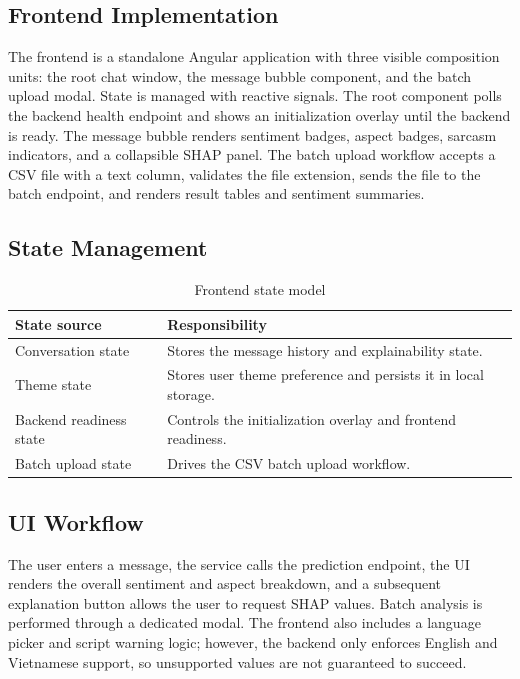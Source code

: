 \documentclass[12pt, a4paper]{article}
\begin{document}
\subsection{Frontend Implementation}
The frontend is a standalone Angular application with three visible composition units: the root chat window, the message bubble component, and the batch upload modal. State is managed with reactive signals. The root component polls the backend health endpoint and shows an initialization overlay until the backend is ready. The message bubble renders sentiment badges, aspect badges, sarcasm indicators, and a collapsible SHAP panel. The batch upload workflow accepts a CSV file with a text column, validates the file extension, sends the file to the batch endpoint, and renders result tables and sentiment summaries.

\subsection{State Management}
\begin{table}[H]
\centering
\caption{Frontend state model}
\begin{tabularx}{\textwidth}{@{} p{3cm} X @{}}
\toprule
\textbf{State source} & \textbf{Responsibility} \\
\midrule
Conversation state & Stores the message history and explainability state. \\
Theme state & Stores user theme preference and persists it in local storage. \\
Backend readiness state & Controls the initialization overlay and frontend readiness. \\
Batch upload state & Drives the CSV batch upload workflow. \\
\bottomrule
\end{tabularx}
\end{table}

\subsection{UI Workflow}
The user enters a message, the service calls the prediction endpoint, the UI renders the overall sentiment and aspect breakdown, and a subsequent explanation button allows the user to request SHAP values. Batch analysis is performed through a dedicated modal. The frontend also includes a language picker and script warning logic; however, the backend only enforces English and Vietnamese support, so unsupported values are not guaranteed to succeed.
\end{document}
